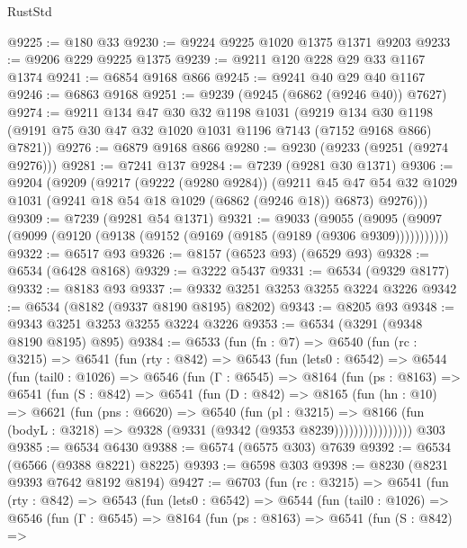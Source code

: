 \begin{lexlean}{RustStd}
\begin{coremodule}
@9225 := @180 @33
@9230 := @9224 @9225 @1020 @1375 @1371 @9203
@9233 := @9206 @229 @9225 @1375
@9239 := @9211 @120 @228 @29 @33 @1167 @1374
@9241 := @6854 @9168 @866
@9245 := @9241 @40 @29 @40 @1167
@9246 := @6863 @9168
@9251 := @9239 (@9245 (@6862 (@9246 @40)) @7627)
@9274 := @9211
    @134
    @47
    @30
    @32
    @1198
    @1031
    (@9219 @134 @30 @1198 (@9191 @75 @30 @47 @32 @1020 @1031 @1196 @7143 (@7152 @9168 @866) @7821))
@9276 := @6879 @9168 @866
@9280 := @9230 (@9233 (@9251 (@9274 @9276)))
@9281 := @7241 @137
@9284 := @7239 (@9281 @30 @1371)
@9306 := @9204
    (@9209
      (@9217
        (@9222 (@9280 @9284))
        (@9211
          @45
          @47
          @54
          @32
          @1029
          @1031
          (@9241 @18 @54 @18 @1029 (@6862 (@9246 @18)) @6873)
          @9276)))
@9309 := @7239 (@9281 @54 @1371)
@9321 := @9033
    (@9055 (@9095 (@9097 (@9099 (@9120 (@9138 (@9152 (@9169 (@9185 (@9189 (@9306 @9309)))))))))))
@9322 := @6517 @93
@9326 := @8157 (@6523 @93) (@6529 @93)
@9328 := @6534 (@6428 @8168)
@9329 := @3222 @5437
@9331 := @6534 (@9329 @8177)
@9332 := @8183 @93
@9337 := @9332 @3251 @3253 @3255 @3224 @3226
@9342 := @6534 (@8182 (@9337 @8190 @8195) @8202)
@9343 := @8205 @93
@9348 := @9343 @3251 @3253 @3255 @3224 @3226
@9353 := @6534 (@3291 (@9348 @8190 @8195) @895)
@9384 := @6533
    (fun (fn : @7) =>
    @6540
      (fun (rc : @3215) =>
      @6541
        (fun (rty : @842) =>
        @6543
          (fun (lets0 : @6542) =>
          @6544
            (fun (tail0 : @1026) =>
            @6546
              (fun (Γ : @6545) =>
              @8164
                (fun (ps : @8163) =>
                @6541
                  (fun (S : @842) =>
                  @6541
                    (fun (D : @842) =>
                    @8165
                      (fun (hn : @10) =>
                      @6621
                        (fun (pns : @6620) =>
                        @6540
                          (fun (pl : @3215) =>
                          @8166
                            (fun (bodyL : @3218) => @9328 (@9331 (@9342 (@9353 @8239))))))))))))))))
    @303
@9385 := @6534 @6430
@9388 := @6574 (@6575 @303) @7639
@9392 := @6534 (@6566 (@9388 @8221) @8225)
@9393 := @6598 @303
@9398 := @8230 (@8231 @9393 @7642 @8192 @8194)
@9427 := @6703
    (fun (rc : @3215) =>
    @6541
      (fun (rty : @842) =>
      @6543
        (fun (lets0 : @6542) =>
        @6544
          (fun (tail0 : @1026) =>
          @6546
            (fun (Γ : @6545) =>
            @8164
              (fun (ps : @8163) =>
              @6541
                (fun (S : @842) =>

\end{coremodule}
\end{lexlean}
